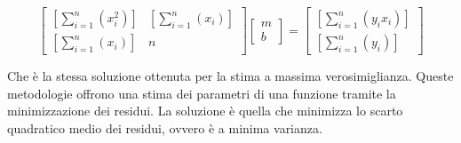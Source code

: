 \documentclass[\main/main.tex]{subfiles}
\begin{document}
\[
	\begin{bmatrix}
		\left [ \sum_{i=1}^n \left(x_i^2 \right) \right ] & \left [ \sum_{i=1}^n \left(x_i \right) \right ] \\
		\left [ \sum_{i=1}^n \left(x_i \right) \right ]   & n
	\end{bmatrix}
	\begin{bmatrix}
		m \\
		b
	\end{bmatrix}
	=
	\begin{bmatrix}
		\left [ \sum_{i=1}^n \left(y_i x_i \right) \right ] \\
		\left [ \sum_{i=1}^n \left(y_i \right) \right ]
	\end{bmatrix}
\]

Che è la stessa soluzione ottenuta per la stima a massima verosimiglianza. Queste metodologie offrono una stima dei parametri di una funzione tramite la minimizzazione dei residui.
La soluzione è quella che minimizza lo scarto quadratico medio dei residui, ovvero è a minima varianza.
\end{document}

